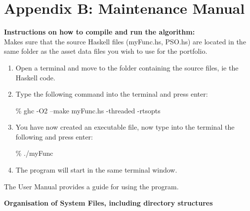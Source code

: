 \chapter*{Appendix B: Maintenance Manual}

\textbf{Instructions on how to compile and run the algorithm:} \\
Makes sure that the source Haskell files (myFunc.hs, PSO.hs) are located in the same folder as the asset data files you wish to use for the portfolio.

\begin{enumerate}
  \item Open a terminal and move to the folder containing the source files, ie the Haskell code.
  \item Type the following command into the terminal and press enter:
\begin{center} \% ghc -O2 --make myFunc.hs -threaded -rtsopts \end{center}
  \item You have now created an executable file, now type into the terminal the following and press enter:
\begin{center} \% ./myFunc \end{center}
  \item The program will start in the same terminal window.
\end{enumerate}
The User Manual provides a guide for using the program. 

\textbf{Organisation of System Files, including directory structures} \\

